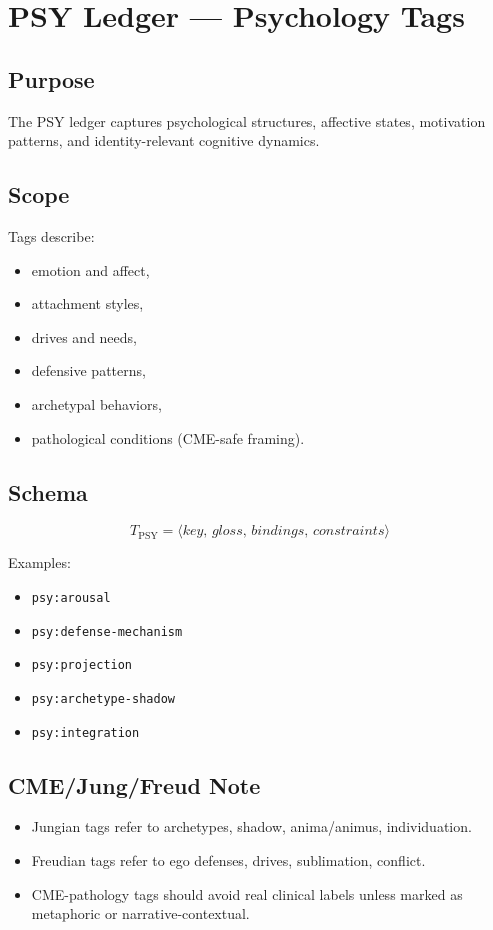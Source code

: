 \chapter{PSY Ledger --- Psychology Tags}
\label{chap:PSY_Ledger}

\section{Purpose}

The PSY ledger captures psychological structures, affective states,
motivation patterns, and identity-relevant cognitive dynamics.

\section{Scope}

Tags describe:
\begin{itemize}
    \item emotion and affect,
    \item attachment styles,
    \item drives and needs,
    \item defensive patterns,
    \item archetypal behaviors,
    \item pathological conditions (CME-safe framing).
\end{itemize}

\section{Schema}

\[
T_{\text{PSY}} = \langle key,\, gloss,\, bindings,\, constraints \rangle
\]

Examples:
\begin{itemize}
    \item \texttt{psy:arousal}
    \item \texttt{psy:defense-mechanism}
    \item \texttt{psy:projection}
    \item \texttt{psy:archetype-shadow}
    \item \texttt{psy:integration}
\end{itemize}

\section{CME/Jung/Freud Note}

\begin{itemize}
    \item Jungian tags refer to archetypes, shadow, anima/animus, individuation.
    \item Freudian tags refer to ego defenses, drives, sublimation, conflict.
    \item CME-pathology tags should avoid real clinical labels unless marked
          as metaphoric or narrative-contextual.
\end{itemize}

